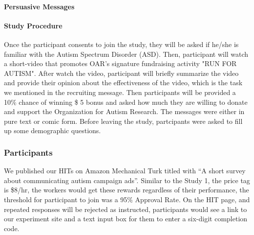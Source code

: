 \paragraph{Persuasive Messages}

\paragraph{Study Procedure} Once the participant consents to join the study, they will be asked if he/she is familiar with the Autism Spectrum Disorder (ASD). Then, participant will watch a short-video that promotes OAR's signature fundraising activity "RUN FOR AUTISM". After watch the video, participant will briefly summarize the video and provide their opinion about the effectiveness of the video, which is the task we mentioned in the recruiting message. Then participants will be provided a 10\% chance of winning \$ 5 bonus and asked how much they are willing to donate and support the Organization for Autism Research. The messages were either in pure text or comic form. Before leaving the study, partcipants were asked to fill up some demographic questions.

\subsubsection{Participants}
We published our HITs on Amazon Mechanical Turk titled with ``A short survey about communicating autism campaign ads''. Similar to the Study 1, the price tag is \$8/hr, the workers would get these rewards regardless of their performance, the threshold for participant to join was a 95\% Approval Rate. On the HIT page, and repeated responses will be rejected as instructed, participants would see a link to our experiment site and a text input box for them to enter a six-digit completion code.
